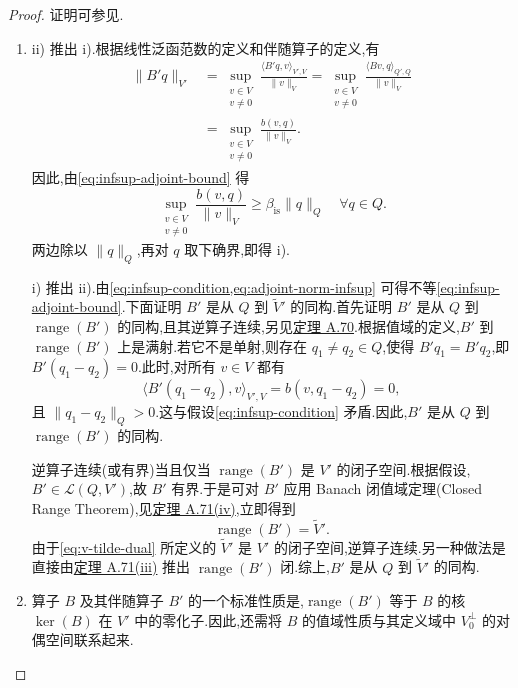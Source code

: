 \begin{proof}
证明可参见\textcite{GiraultRaviart1986}.
\begin{enumerate}
  \item[i) 与 ii) 等价.]
  ii) 推出 i).根据线性泛函范数的定义和伴随算子的定义,有
  \begin{equation}\label{eq:adjoint-norm-infsup}
  \begin{aligned}
    \|B'q\|_{V'}
      &=\sup_{\substack{v\in V\\v\ne0}}
        \frac{\langle B'q,v\rangle_{V',V}}{\|v\|_V}
       =\sup_{\substack{v\in V\\v\ne0}}
        \frac{\langle Bv,q\rangle_{Q',Q}}{\|v\|_V}\\
      &=\sup_{\substack{v\in V\\v\ne0}}
        \frac{b(v,q)}{\|v\|_V}.
  \end{aligned}
  \end{equation}
  因此,由\cref{eq:infsup-adjoint-bound} 得
  \[
    \sup_{\substack{v\in V\\v\ne0}}
    \frac{b(v,q)}{\|v\|_V}
    \ge\beta_{\mathrm{is}}\|q\|_Q
    \quad\forall q\in Q.
  \]
  两边除以 $\|q\|_Q$,再对 $q$ 取下确界,即得 i).

  i) 推出 ii).由\cref{eq:infsup-condition,eq:adjoint-norm-infsup} 可得不等\cref{eq:infsup-adjoint-bound}.下面证明 $B'$ 是从 $Q$ 到 $\widetilde{V}'$ 的同构.首先证明 $B'$ 是从 $Q$ 到 $\operatorname{range}(B')$ 的同构,且其逆算子连续,另见\hyperref[thm:appendix-a-70]{定理 A.70}.根据值域的定义,$B'$ 到 $\operatorname{range}(B')$ 上是满射.若它不是单射,则存在 $q_1\ne q_2\in Q$,使得 $B'q_1=B'q_2$,即 $B'(q_1-q_2)=0$.此时,对所有 $v\in V$ 都有
  \[
    \langle B'(q_1-q_2),v\rangle_{V',V}
      =b(v,q_1-q_2)=0,
  \]
  且 $\|q_1-q_2\|_Q>0$.这与假设\cref{eq:infsup-condition} 矛盾.因此,$B'$ 是从 $Q$ 到 $\operatorname{range}(B')$ 的同构.

  逆算子连续(或有界)当且仅当 $\operatorname{range}(B')$ 是 $V'$ 的闭子空间.根据假设,$B'\in\mathcal{L}(Q,V')$,故 $B'$ 有界.于是可对 $B'$ 应用 Banach 闭值域定理(Closed Range Theorem),见\hyperref[thm:appendix-a-71]{定理 A.71(iv)},立即得到
  \[
    \operatorname{range}(B')=\widetilde{V}'.
  \]
  由于\cref{eq:v-tilde-dual} 所定义的 $\widetilde{V}'$ 是 $V'$ 的闭子空间,逆算子连续.另一种做法是直接由\hyperref[thm:appendix-a-71]{定理 A.71(iii)} 推出 $\operatorname{range}(B')$ 闭.综上,$B'$ 是从 $Q$ 到 $\widetilde{V}'$ 的同构.
  \item[ii) 与 iii) 等价.]
  算子 $B$ 及其伴随算子 $B'$ 的一个标准性质是,$\operatorname{range}(B')$ 等于 $B$ 的核 $\ker(B)$ 在 $V'$ 中的零化子.因此,还需将 $B$ 的值域性质与其定义域中 $V_0^{\perp}$ 的对偶空间联系起来.


\end{enumerate}
\end{proof}
